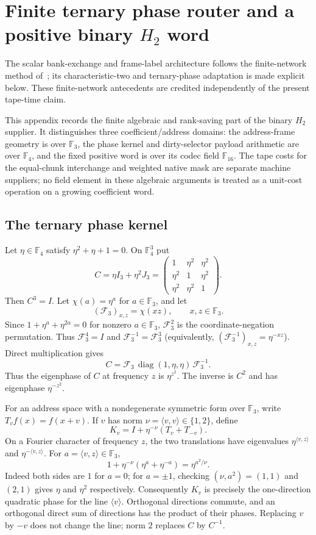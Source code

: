 \section{Finite ternary phase router and a positive binary $H_2$ word}
\label{app:finite-phase}

The scalar bank-exchange and frame-label architecture follows the
finite-network method of~\cite{swap}; its characteristic-two and
ternary-phase adaptation is made explicit below. These finite-network
antecedents are credited independently of the present tape-time claim.

This appendix records the finite algebraic and rank-saving part of the
binary $H_2$ supplier. It distinguishes three coefficient/address domains:
the address-frame geometry is over $\mathbb F_3$, the phase kernel and
dirty-selector payload arithmetic are over $\mathbb F_4$, and the fixed
positive word is over its codec field $\mathbb F_{16}$. The tape costs for
the equal-chunk interchange and weighted native mask are separate machine
suppliers; no field element in these algebraic arguments is treated as a
unit-cost operation on a growing coefficient word.

\subsection{The ternary phase kernel}

Let $\eta\in\mathbb F_4$ satisfy $\eta^2+\eta+1=0$. On $\mathbb F_4^3$ put
\[
 C=\eta I_3+\eta^2J_3
 =\begin{pmatrix}1&\eta^2&\eta^2\\
 \eta^2&1&\eta^2\\\eta^2&\eta^2&1\end{pmatrix}.
\]
Then $C^3=I$. Let $\chi(a)=\eta^a$ for $a\in\mathbb F_3$, and let
\[
 (\mathcal F_3)_{x,z}=\chi(xz),\qquad x,z\in\mathbb F_3.
\]
Since $1+\eta^a+\eta^{2a}=0$ for nonzero $a\in\mathbb F_3$,
$\mathcal F_3^2$ is the coordinate-negation permutation. Thus
$\mathcal F_3^4=I$ and $\mathcal F_3^{-1}=\mathcal F_3^3$ (equivalently,
$(\mathcal F_3^{-1})_{x,z}=\eta^{-xz}$).
Direct multiplication gives
\[
 C=\mathcal F_3\,\operatorname{diag}(1,\eta,\eta)\,\mathcal F_3^{-1}.
\]
Thus the eigenphase of $C$ at frequency $z$ is $\eta^{z^2}$. The inverse
is $C^2$ and has eigenphase $\eta^{-z^2}$.

For an address space with a nondegenerate symmetric form over $\mathbb F_3$,
write $T_v f(x)=f(x+v)$. If $v$ has norm $\nu=\langle v,v\rangle\in
\{1,2\}$, define
\[
 K_v=I+\eta^{-\nu}(T_v+T_{-v}).                         \tag{A.1}
\]
On a Fourier character of frequency $z$, the two translations have
eigenvalues $\eta^{\langle v,z\rangle}$ and
$\eta^{-\langle v,z\rangle}$. For $a=\langle v,z\rangle\in\mathbb F_3$,
\[
 1+\eta^{-\nu}(\eta^a+\eta^{-a})=\eta^{a^2/\nu}.     \tag{A.2}
\]
Indeed both sides are $1$ for $a=0$; for $a=\pm1$, checking
$(\nu,a^2)=(1,1)$ and $(2,1)$ gives $\eta$ and $\eta^2$ respectively.
Consequently $K_v$ is precisely the one-direction quadratic phase for
the line $\langle v\rangle$. Orthogonal directions commute, and an
orthogonal direct sum of directions has the product of their phases.
Replacing $v$ by $-v$ does not change the line; norm $2$ replaces $C$ by
$C^{-1}$.

